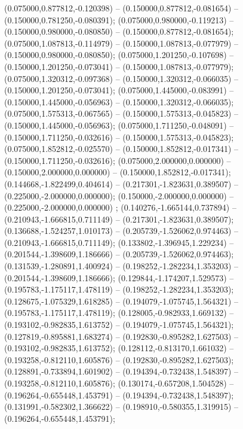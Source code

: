  (0.075000,0.877812,-0.120398) -- (0.150000,0.877812,-0.081654) -- (0.150000,0.781250,-0.080391);
 (0.075000,0.980000,-0.119213) -- (0.150000,0.980000,-0.080850) -- (0.150000,0.877812,-0.081654);
 (0.075000,1.087813,-0.114979) -- (0.150000,1.087813,-0.077979) -- (0.150000,0.980000,-0.080850);
 (0.075000,1.201250,-0.107698) -- (0.150000,1.201250,-0.073041) -- (0.150000,1.087813,-0.077979);
 (0.075000,1.320312,-0.097368) -- (0.150000,1.320312,-0.066035) -- (0.150000,1.201250,-0.073041);
 (0.075000,1.445000,-0.083991) -- (0.150000,1.445000,-0.056963) -- (0.150000,1.320312,-0.066035);
 (0.075000,1.575313,-0.067565) -- (0.150000,1.575313,-0.045823) -- (0.150000,1.445000,-0.056963);
 (0.075000,1.711250,-0.048091) -- (0.150000,1.711250,-0.032616) -- (0.150000,1.575313,-0.045823);
 (0.075000,1.852812,-0.025570) -- (0.150000,1.852812,-0.017341) -- (0.150000,1.711250,-0.032616);
 (0.075000,2.000000,0.000000) -- (0.150000,2.000000,0.000000) -- (0.150000,1.852812,-0.017341);
 (0.144668,-1.822499,0.404614) -- (0.217301,-1.823631,0.389507) -- (0.225000,-2.000000,0.000000);
 (0.150000,-2.000000,0.000000) -- (0.225000,-2.000000,0.000000) ;
 (0.140276,-1.665144,0.737894) -- (0.210943,-1.666815,0.711149) -- (0.217301,-1.823631,0.389507);
 (0.136688,-1.524257,1.010173) -- (0.205739,-1.526062,0.974463) -- (0.210943,-1.666815,0.711149);
 (0.133802,-1.396945,1.229234) -- (0.201544,-1.398609,1.186666) -- (0.205739,-1.526062,0.974463);
 (0.131539,-1.280891,1.400924) -- (0.198252,-1.282234,1.353203) -- (0.201544,-1.398609,1.186666);
 (0.129844,-1.174207,1.529573) -- (0.195783,-1.175117,1.478119) -- (0.198252,-1.282234,1.353203);
 (0.128675,-1.075329,1.618285) -- (0.194079,-1.075745,1.564321) -- (0.195783,-1.175117,1.478119);
 (0.128005,-0.982933,1.669132) -- (0.193102,-0.982835,1.613752) -- (0.194079,-1.075745,1.564321);
 (0.127819,-0.895881,1.683274) -- (0.192830,-0.895282,1.627503) -- (0.193102,-0.982835,1.613752);
 (0.128112,-0.813170,1.661032) -- (0.193258,-0.812110,1.605876) -- (0.192830,-0.895282,1.627503);
 (0.128891,-0.733894,1.601902) -- (0.194394,-0.732438,1.548397) -- (0.193258,-0.812110,1.605876);
 (0.130174,-0.657208,1.504528) -- (0.196264,-0.655448,1.453791) -- (0.194394,-0.732438,1.548397);
 (0.131991,-0.582302,1.366622) -- (0.198910,-0.580355,1.319915) -- (0.196264,-0.655448,1.453791);
